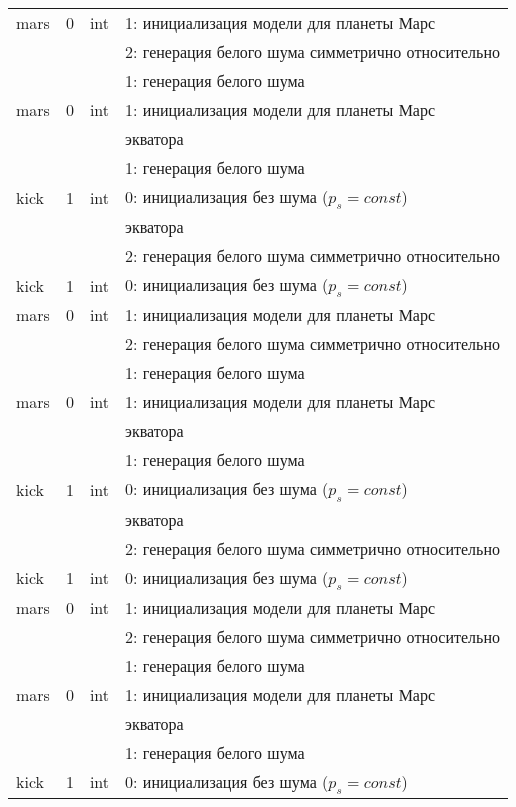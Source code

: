 \begin{longtable*}[c]{|l|c|l|l|}
 mars & 0 & int & 1: инициализация модели для планеты Марс     \\
&   &     & 2: генерация белого шума симметрично относительно \\
      &   &     & 1: генерация белого шума                  \\
      mars & 0 & int & 1: инициализация модели для планеты Марс     \\
  & & & экватора    \\
 &   &     & 1: генерация белого шума                  \\
kick & 1 & int & 0: инициализация без шума (\(p_s = const\)) \\
      & & & экватора    \\
      &   &     & 2: генерация белого шума симметрично относительно \\
  kick & 1 & int & 0: инициализация без шума (\(p_s = const\)) \\
 mars & 0 & int & 1: инициализация модели для планеты Марс     \\
&   &     & 2: генерация белого шума симметрично относительно \\
      &   &     & 1: генерация белого шума                  \\
      mars & 0 & int & 1: инициализация модели для планеты Марс     \\
  & & & экватора    \\
 &   &     & 1: генерация белого шума                  \\
kick & 1 & int & 0: инициализация без шума (\(p_s = const\)) \\
      & & & экватора    \\
      &   &     & 2: генерация белого шума симметрично относительно \\
  kick & 1 & int & 0: инициализация без шума (\(p_s = const\)) \\
 mars & 0 & int & 1: инициализация модели для планеты Марс     \\
&   &     & 2: генерация белого шума симметрично относительно \\
      &   &     & 1: генерация белого шума                  \\
      mars & 0 & int & 1: инициализация модели для планеты Марс     \\
  & & & экватора    \\
 &   &     & 1: генерация белого шума                  \\
kick & 1 & int & 0: инициализация без шума (\(p_s = const\)) \\

\end{longtable*}
